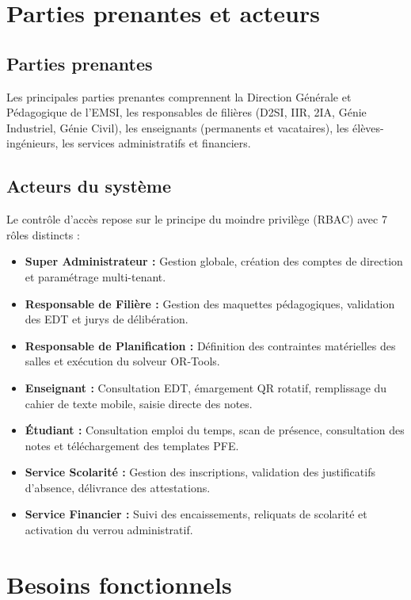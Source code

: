 \documentclass[11pt,a4paper]{report}
\begin{document}
\chapter{Parties prenantes et acteurs}

\section{Parties prenantes}
Les principales parties prenantes comprennent la Direction Générale et Pédagogique de l'EMSI, les responsables de filières (D2SI, IIR, 2IA, Génie Industriel, Génie Civil), les enseignants (permanents et vacataires), les élèves-ingénieurs, les services administratifs et financiers.

\section{Acteurs du système}
Le contrôle d'accès repose sur le principe du moindre privilège (RBAC) avec 7 rôles distincts :
\begin{itemize}[leftmargin=1.5cm]
    \item \textbf{Super Administrateur :} Gestion globale, création des comptes de direction et paramétrage multi-tenant.
    \item \textbf{Responsable de Filière :} Gestion des maquettes pédagogiques, validation des EDT et jurys de délibération.
    \item \textbf{Responsable de Planification :} Définition des contraintes matérielles des salles et exécution du solveur OR-Tools.
    \item \textbf{Enseignant :} Consultation EDT, émargement QR rotatif, remplissage du cahier de texte mobile, saisie directe des notes.
    \item \textbf{Étudiant :} Consultation emploi du temps, scan de présence, consultation des notes et téléchargement des templates PFE.
    \item \textbf{Service Scolarité :} Gestion des inscriptions, validation des justificatifs d'absence, délivrance des attestations.
    \item \textbf{Service Financier :} Suivi des encaissements, reliquats de scolarité et activation du verrou administratif.
\end{itemize}

\chapter{Besoins fonctionnels}
\end{document}
